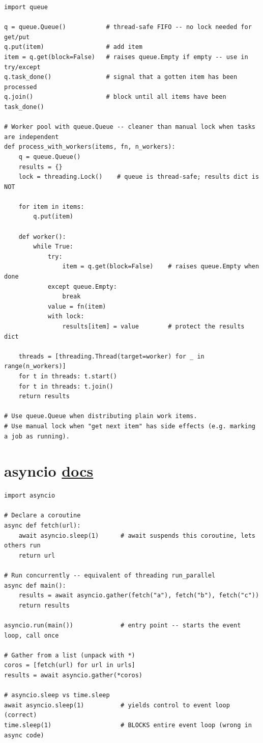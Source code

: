 \documentclass[10pt,letterpaper]{article}
\begin{document}
\begin{lstlisting}
import queue

q = queue.Queue()           # thread-safe FIFO -- no lock needed for get/put
q.put(item)                 # add item
item = q.get(block=False)   # raises queue.Empty if empty -- use in try/except
q.task_done()               # signal that a gotten item has been processed
q.join()                    # block until all items have been task_done()

# Worker pool with queue.Queue -- cleaner than manual lock when tasks are independent
def process_with_workers(items, fn, n_workers):
    q = queue.Queue()
    results = {}
    lock = threading.Lock()    # queue is thread-safe; results dict is NOT

    for item in items:
        q.put(item)

    def worker():
        while True:
            try:
                item = q.get(block=False)    # raises queue.Empty when done
            except queue.Empty:
                break
            value = fn(item)
            with lock:
                results[item] = value        # protect the results dict

    threads = [threading.Thread(target=worker) for _ in range(n_workers)]
    for t in threads: t.start()
    for t in threads: t.join()
    return results

# Use queue.Queue when distributing plain work items.
# Use manual lock when "get next item" has side effects (e.g. marking a job as running).
\end{lstlisting}

\section{asyncio \normalfont\small\href{https://docs.python.org/3/library/asyncio.html}{docs}}

\begin{lstlisting}
import asyncio

# Declare a coroutine
async def fetch(url):
    await asyncio.sleep(1)      # await suspends this coroutine, lets others run
    return url

# Run concurrently -- equivalent of threading run_parallel
async def main():
    results = await asyncio.gather(fetch("a"), fetch("b"), fetch("c"))
    return results

asyncio.run(main())             # entry point -- starts the event loop, call once

# Gather from a list (unpack with *)
coros = [fetch(url) for url in urls]
results = await asyncio.gather(*coros)

# asyncio.sleep vs time.sleep
await asyncio.sleep(1)          # yields control to event loop (correct)
time.sleep(1)                   # BLOCKS entire event loop (wrong in async code)
\end{lstlisting}
\end{document}
